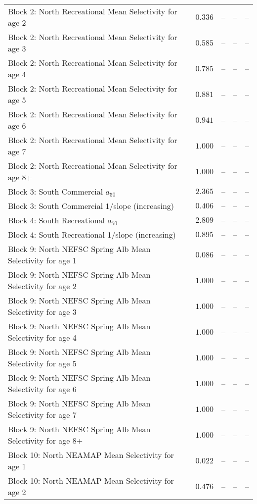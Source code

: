 \documentclass[
]{article}
\begin{document}
\begin{landscape}
\begin{longtable}[t]{lrrrr}
\addlinespace
Block 2: North Recreational Mean Selectivity for age 2 & $0.336$ & -- & -- & --\\
Block 2: North Recreational Mean Selectivity for age 3 & $0.585$ & -- & -- & --\\
Block 2: North Recreational Mean Selectivity for age 4 & $0.785$ & -- & -- & --\\
Block 2: North Recreational Mean Selectivity for age 5 & $0.881$ & -- & -- & --\\
Block 2: North Recreational Mean Selectivity for age 6 & $0.941$ & -- & -- & --\\
\addlinespace
Block 2: North Recreational Mean Selectivity for age 7 & $1.000$ & -- & -- & --\\
Block 2: North Recreational Mean Selectivity for age 8+ & $1.000$ & -- & -- & --\\
Block 3: South Commercial $a_{50}$ & $2.365$ & -- & -- & --\\
Block 3: South Commercial 1/slope (increasing) & $0.406$ & -- & -- & --\\
Block 4: South Recreational $a_{50}$ & $2.809$ & -- & -- & --\\
\addlinespace
Block 4: South Recreational 1/slope (increasing) & $0.895$ & -- & -- & --\\
Block 9: North NEFSC Spring Alb Mean Selectivity for age 1 & $0.086$ & -- & -- & --\\
Block 9: North NEFSC Spring Alb Mean Selectivity for age 2 & $1.000$ & -- & -- & --\\
Block 9: North NEFSC Spring Alb Mean Selectivity for age 3 & $1.000$ & -- & -- & --\\
Block 9: North NEFSC Spring Alb Mean Selectivity for age 4 & $1.000$ & -- & -- & --\\
\addlinespace
Block 9: North NEFSC Spring Alb Mean Selectivity for age 5 & $1.000$ & -- & -- & --\\
Block 9: North NEFSC Spring Alb Mean Selectivity for age 6 & $1.000$ & -- & -- & --\\
Block 9: North NEFSC Spring Alb Mean Selectivity for age 7 & $1.000$ & -- & -- & --\\
Block 9: North NEFSC Spring Alb Mean Selectivity for age 8+ & $1.000$ & -- & -- & --\\
Block 10: North NEAMAP Mean Selectivity for age 1 & $0.022$ & -- & -- & --\\
\addlinespace
Block 10: North NEAMAP Mean Selectivity for age 2 & $0.476$ & -- & -- & --\\

\end{longtable}
\end{landscape}
\end{document}
